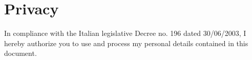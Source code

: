 \documentclass[11pt,a4paper,sans]{moderncv} %
\begin{document}
\section{Privacy}
In compliance with the Italian legislative Decree no. 196 dated 30/06/2003, I hereby authorize you to use and process my personal details contained in this document.

\end{document}
